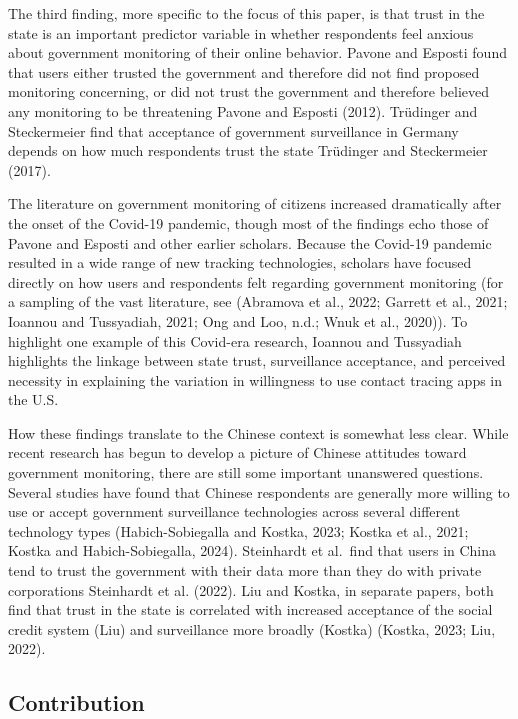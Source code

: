 \documentclass[
  letterpaper,
  DIV=11,
  numbers=noendperiod]{scrartcl}
\begin{document}
The third finding, more specific to the focus of this paper, is that
trust in the state is an important predictor variable in whether
respondents feel anxious about government monitoring of their online
behavior. Pavone and Esposti found that users either trusted the
government and therefore did not find proposed monitoring concerning, or
did not trust the government and therefore believed any monitoring to be
threatening Pavone and Esposti (2012). Trüdinger and Steckermeier find
that acceptance of government surveillance in Germany depends on how
much respondents trust the state Trüdinger and Steckermeier (2017).

The literature on government monitoring of citizens increased
dramatically after the onset of the Covid-19 pandemic, though most of
the findings echo those of Pavone and Esposti and other earlier
scholars. Because the Covid-19 pandemic resulted in a wide range of new
tracking technologies, scholars have focused directly on how users and
respondents felt regarding government monitoring (for a sampling of the
vast literature, see (Abramova et al., 2022; Garrett et al., 2021;
Ioannou and Tussyadiah, 2021; Ong and Loo, n.d.; Wnuk et al., 2020)). To
highlight one example of this Covid-era research, Ioannou and Tussyadiah
highlights the linkage between state trust, surveillance acceptance, and
perceived necessity in explaining the variation in willingness to use
contact tracing apps in the U.S.

How these findings translate to the Chinese context is somewhat less
clear. While recent research has begun to develop a picture of Chinese
attitudes toward government monitoring, there are still some important
unanswered questions. Several studies have found that Chinese
respondents are generally more willing to use or accept government
surveillance technologies across several different technology types
(Habich-Sobiegalla and Kostka, 2023; Kostka et al., 2021; Kostka and
Habich-Sobiegalla, 2024). Steinhardt et al.~find that users in China
tend to trust the government with their data more than they do with
private corporations Steinhardt et al. (2022). Liu and Kostka, in
separate papers, both find that trust in the state is correlated with
increased acceptance of the social credit system (Liu) and surveillance
more broadly (Kostka) (Kostka, 2023; Liu, 2022).

\subsection{Contribution}\label{contribution}
\end{document}
